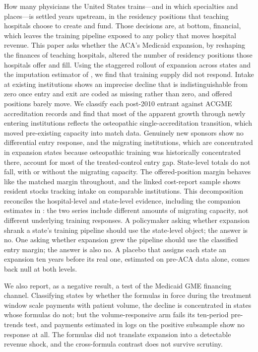 How many physicians the United States trains---and in which specialties and places---is settled years upstream, in the residency positions that teaching hospitals choose to create and fund. Those decisions are, at bottom, financial, which leaves the training pipeline exposed to any policy that moves hospital revenue. This paper asks whether the ACA's Medicaid expansion, by reshaping the finances of teaching hospitals, altered the number of residency positions those hospitals offer and fill. Using the staggered rollout of expansion across states and the imputation estimator of \textcite{borusyak2024revisiting}, we find that training supply did not respond. Intake at existing institutions shows an imprecise decline that is indistinguishable from zero once entry and exit are coded as missing rather than zero, and offered positions barely move. We classify each post-2010 entrant against ACGME accreditation records and find that most of the apparent growth through newly entering institutions reflects the osteopathic single-accreditation transition, which moved pre-existing capacity into match data. Genuinely new sponsors show no differential entry response, and the migrating institutions, which are concentrated in expansion states because osteopathic training was historically concentrated there, account for most of the treated-control entry gap. State-level totals do not fall, with or without the migrating capacity. The offered-position margin behaves like the matched margin throughout, and the linked cost-report sample shows resident stocks tracking intake on comparable institutions. This decomposition reconciles the hospital-level and state-level evidence, including the companion estimates in \textcite{ang_beniwal2026}: the two series include different amounts of migrating capacity, not different underlying training responses. A policymaker asking whether expansion shrank a state's training pipeline should use the state-level object; the answer is no. One asking whether expansion grew the pipeline should use the classified entry margin; the answer is also no. A placebo that assigns each state an expansion ten years before its real one, estimated on pre-ACA data alone, comes back null at both levels.

We also report, as a negative result, a test of the Medicaid GME financing channel. Classifying states by whether the formulas in force during the treatment window scale payments with patient volume, the decline is concentrated in states whose formulas do not; but the volume-responsive arm fails its ten-period pre-trends test, and payments estimated in logs on the positive subsample show no response at all. The formulas did not translate expansion into a detectable revenue shock, and the cross-formula contrast does not survive scrutiny.

